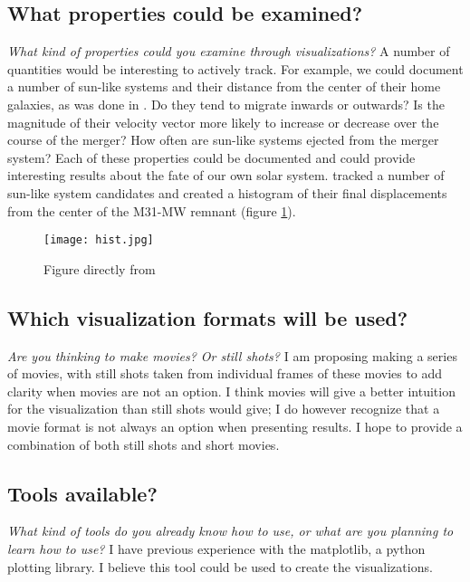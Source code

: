 \documentclass[twocolumn]{aastex63}
\begin{document}
\subsection{What properties could be examined?}
\emph{What kind of properties could you examine through visualizations?} A number of quantities would be interesting to actively track. For example, we could document a number of sun-like systems and their distance from the center of their home galaxies, as was done in \cite{vdm19}. Do they tend to migrate inwards or outwards? Is the magnitude of their velocity vector more likely to increase or decrease over the course of the merger? How often are sun-like systems ejected from the merger system? Each of these properties could be documented and could provide interesting results about the fate of our own solar system. \cite{vdm12} tracked a number of sun-like system candidates and created a histogram of their final displacements from the center of the M31-MW remnant (figure \ref{fig:hist}).

\begin{figure}[htp]
    \centering
    \texttt{[image: hist.jpg]}
    \caption{Figure directly from \cite{vdm12}}
    \label{fig:hist}
\end{figure}

\subsection{Which visualization formats will be used?}
\emph{Are you thinking to make movies? Or still shots?} I am proposing making a series of movies, with still shots taken from individual frames of these movies to add clarity when movies are not an option. I think movies will give a better intuition for the visualization than still shots would give; I do however recognize that a movie format is not always an option when presenting results. I hope to provide a combination of both still shots and short movies.

\subsection{Tools available?}
\emph{What kind of tools do you already know how to use, or what are you planning to learn how to use?} I have previous experience with the matplotlib, a python plotting library. I believe this tool could be used to create the visualizations. 
\end{document}
